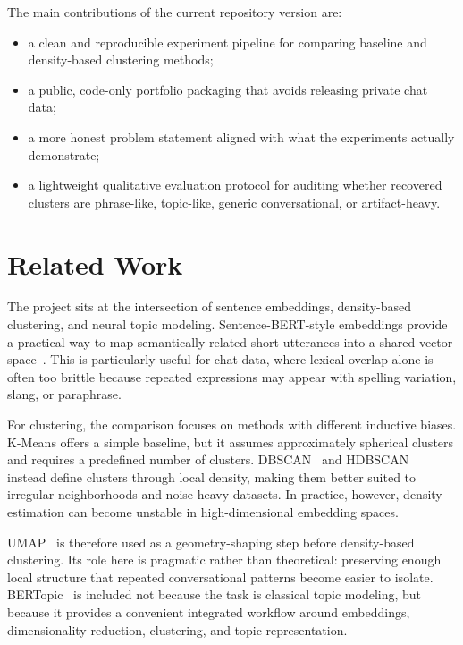 \documentclass{bmvc2k}
\begin{document}
The main contributions of the current repository version are:
\begin{itemize}
    \item a clean and reproducible experiment pipeline for comparing baseline and density-based clustering methods;
    \item a public, code-only portfolio packaging that avoids releasing private chat data;
    \item a more honest problem statement aligned with what the experiments actually demonstrate;
    \item a lightweight qualitative evaluation protocol for auditing whether recovered clusters are phrase-like, topic-like, generic conversational, or artifact-heavy.
\end{itemize}

\section{Related Work}

The project sits at the intersection of sentence embeddings, density-based clustering, and neural topic modeling. Sentence-BERT-style embeddings provide a practical way to map semantically related short utterances into a shared vector space~\cite{reimers2019sentencebert}. This is particularly useful for chat data, where lexical overlap alone is often too brittle because repeated expressions may appear with spelling variation, slang, or paraphrase.

For clustering, the comparison focuses on methods with different inductive biases. K-Means offers a simple baseline, but it assumes approximately spherical clusters and requires a predefined number of clusters. DBSCAN~\cite{ester1996dbscan} and HDBSCAN~\cite{campello2015hdbscan} instead define clusters through local density, making them better suited to irregular neighborhoods and noise-heavy datasets. In practice, however, density estimation can become unstable in high-dimensional embedding spaces.

UMAP~\cite{mcinnes2018umap} is therefore used as a geometry-shaping step before density-based clustering. Its role here is pragmatic rather than theoretical: preserving enough local structure that repeated conversational patterns become easier to isolate. BERTopic~\cite{grootendorst2022bertopic} is included not because the task is classical topic modeling, but because it provides a convenient integrated workflow around embeddings, dimensionality reduction, clustering, and topic representation.
\end{document}
